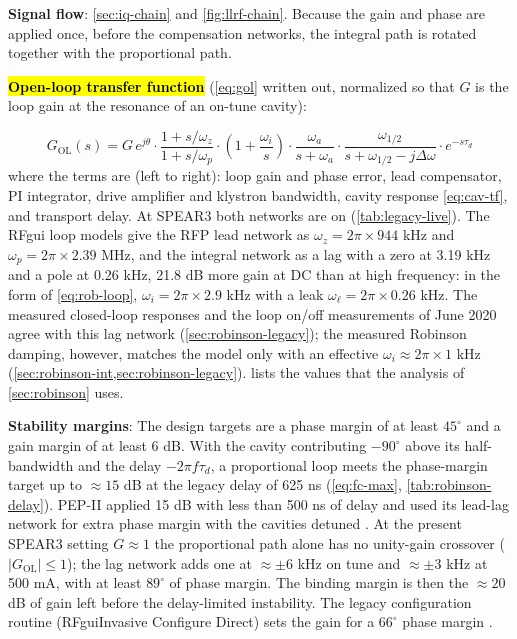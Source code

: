 \textbf{Signal flow}: \cref{sec:iq-chain} and \cref{fig:llrf-chain}. Because the gain and phase are applied once, before the compensation networks, the integral path is rotated together with the proportional path.

\hl{\textbf{Open-loop transfer function}} (\cref{eq:gol} written out, normalized so that \(G\) is the loop gain at the resonance of an on-tune cavity):

\begin{equation}\label{eq:gol-explicit}
G_\text{OL}(s) = G\,e^{j\theta} \cdot \frac{1 + s/\omega_z}{1 + s/\omega_p} \cdot \left(1 + \frac{\omega_i}{s}\right) \cdot \frac{\omega_a}{s + \omega_a} \cdot \frac{\omega_{1/2}}{s + \omega_{1/2} - j\Delta\omega} \cdot e^{-s\tau_d}
\end{equation}
where the terms are (left to right): loop gain and phase error, lead compensator, PI integrator, drive amplifier and klystron bandwidth, cavity response \eqref{eq:cav-tf}, and transport delay. At SPEAR3 both networks are on (\cref{tab:legacy-live}). The RFgui loop models  give the RFP lead network as \(\omega_z = 2\pi \times 944\) kHz and \(\omega_p = 2\pi \times 2.39\) MHz, and the integral network as a lag with a zero at 3.19 kHz and a pole at 0.26 kHz, 21.8 dB more gain at DC than at high frequency: in the form of \cref{eq:rob-loop}, \(\omega_i = 2\pi \times 2.9\) kHz with a leak \(\omega_\ell = 2\pi \times 0.26\) kHz. The measured closed-loop responses and the loop on/off measurements of June 2020 agree with this lag network (\cref{sec:robinson-legacy}); the measured Robinson damping, however, matches the model only with an effective \(\omega_i \approx 2\pi \times 1\) kHz (\cref{sec:robinson-int,sec:robinson-legacy}).  lists the values that the analysis of \cref{sec:robinson} uses.

\textbf{Stability margins}: The design targets are a phase margin of at least \(45^\circ\) and a gain margin of at least 6 dB. With the cavity contributing \(-90^\circ\) above its half-bandwidth and the delay \(-2\pi f\tau_d\), a proportional loop meets the phase-margin target up to \(\approx 15\) dB at the legacy delay of 625 ns (\cref{eq:fc-max}, \cref{tab:robinson-delay}). PEP-II applied 15 dB with less than 500 ns of delay and used its lead-lag network for extra phase margin with the cavities detuned . At the present SPEAR3 setting \(G \approx 1\) the proportional path alone has no unity-gain crossover (\(\lvert G_\text{OL}\rvert \le 1\)); the lag network adds one at \(\approx \pm 6\) kHz on tune and \(\approx \pm 3\) kHz at 500 mA, with at least \(89^\circ\) of phase margin. The binding margin is then the \(\approx 20\) dB of gain left before the delay-limited instability. The legacy configuration routine (RFguiInvasive Configure Direct) sets the gain for a \(66^\circ\) phase margin .

